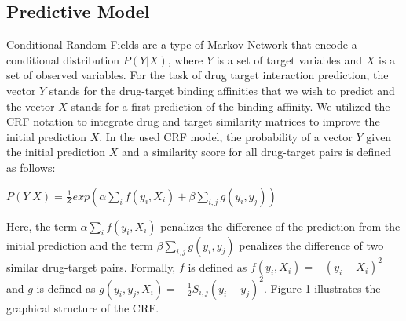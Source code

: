 \documentclass[
journal=jacsat, %
manuscript=article]{achemso}
\begin{document}
\subsection{Predictive Model}
Conditional Random Fields are a type of Markov Network that encode a conditional distribution $P(Y|X)$, where $Y$ is a set of target variables and $X$ is a set of observed variables. For the task of drug target interaction prediction, the vector $Y$ stands for the drug-target binding affinities that we wish to predict and the vector $X$ stands for a first prediction of the binding affinity. We utilized the CRF notation to integrate drug and target similarity matrices to improve the initial prediction $X$. In the used CRF model, the probability of a vector $Y$ given the initial prediction $X$ and a similarity score for all drug-target pairs is defined as follows:
\begin{center}
$P(Y|X) = \frac{1}{Z}exp(\alpha\sum\limits_{i}f(y_i,X_i)+\beta\sum\limits_{i,j}g(y_i,y_j))$
\end{center}
Here, the term $\alpha\sum\limits_{i}f(y_i,X_i)$ penalizes the difference of the prediction from the initial prediction and the term $\beta\sum\limits_{i,j}g(y_i,y_j)$ penalizes the difference of two similar drug-target pairs. Formally, $f$ is defined as $f(y_i,X_i) = -(y_i-X_i)^2$ and $g$ is defined as $g(y_i, y_j, X_i) = -\frac{1}{2}S_{i,j}(y_i-y_j)^2$. Figure 1 illustrates the graphical structure of the CRF.
\end{document}
